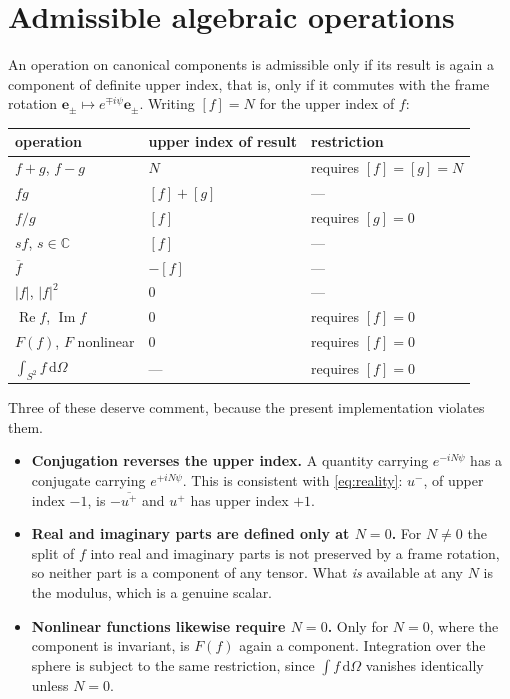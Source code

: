 \documentclass[11pt,a4paper]{article}
\newcommand{\ebasis}[1]{\mathbf{e}_{#1}}
\newcommand{\conj}[1]{\overline{#1}}
\newcommand{\dOmega}{\,\mathrm{d}\Omega}
\begin{document}
\section{Admissible algebraic operations}
\label{sec:algebra}

An operation on canonical components is admissible only if its result is
again a component of definite upper index, that is, only if it commutes
with the frame rotation $\ebasis{\pm} \mapsto e^{\mp i \psi}
\ebasis{\pm}$.  Writing $[f] = N$ for the upper index of $f$:

\begin{center}
\begin{tabular}{lll}
  \toprule
  operation & upper index of result & restriction \\
  \midrule
  $f + g$, $f - g$      & $N$            & requires $[f] = [g] = N$ \\
  $f g$                 & $[f] + [g]$    & --- \\
  $f / g$               & $[f]$          & requires $[g] = 0$ \\
  $s f$, $s \in \mathbb{C}$ & $[f]$      & --- \\
  $\conj{f}$            & $-[f]$         & --- \\
  $|f|$, $|f|^2$        & $0$            & --- \\
  $\operatorname{Re} f$, $\operatorname{Im} f$ & $0$ & requires $[f] = 0$ \\
  $F(f)$, $F$ nonlinear & $0$            & requires $[f] = 0$ \\
  $\int_{S^2} f \dOmega$ & ---           & requires $[f] = 0$ \\
  \bottomrule
\end{tabular}
\end{center}

Three of these deserve comment, because the present implementation
violates them.

\begin{itemize}
  \item \textbf{Conjugation reverses the upper index.}  A quantity
    carrying $e^{-iN\psi}$ has a conjugate carrying $e^{+iN\psi}$.  This
    is consistent with \eqref{eq:reality}: $u^{-}$, of upper index $-1$,
    is $-\conj{u^{+}}$ and $u^{+}$ has upper index $+1$.

  \item \textbf{Real and imaginary parts are defined only at $N = 0$.}
    For $N \neq 0$ the split of $f$ into real and imaginary parts is not
    preserved by a frame rotation, so neither part is a component of any
    tensor.  What \emph{is} available at any $N$ is the modulus, which is
    a genuine scalar.

  \item \textbf{Nonlinear functions likewise require $N = 0$.}  Only for
    $N=0$, where the component is invariant, is $F(f)$ again a
    component.  Integration over the sphere is subject to the same
    restriction, since $\int f \dOmega$ vanishes identically unless
    $N = 0$.
\end{itemize}
\end{document}
